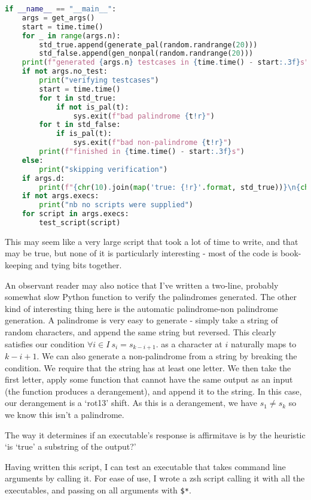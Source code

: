 \documentclass[fleqn,a4paper,11pt]{article}
\begin{document}
\begin{lstlisting}[language=Python, caption=Testing script]
if __name__ == "__main__":
    args = get_args()
    start = time.time()
    for _ in range(args.n):
        std_true.append(generate_pal(random.randrange(20)))
        std_false.append(gen_nonpal(random.randrange(20)))
    print(f"generated {args.n} testcases in {time.time() - start:.3f}s")
    if not args.no_test:
        print("verifying testcases")
        start = time.time()
        for t in std_true:
            if not is_pal(t):
                sys.exit(f"bad palindrome {t!r}")
        for t in std_false:
            if is_pal(t):
                sys.exit(f"bad non-palindrome {t!r}")
        print(f"finished in {time.time() - start:.3f}s")
    else:
        print("skipping verification")
    if args.d:
        print(f"{chr(10).join(map('true: {!r}'.format, std_true))}\n{chr(10).join(map('false: {!r}'.format, std_false))}")
    if not args.execs:
        print("nb no scripts were supplied")
    for script in args.execs:
        test_script(script)
\end{lstlisting}

    This may seem like a very large script that took a lot of time to write, and
    that may be true, but none of it is particularly interesting - most of the
    code is book-keeping and tying bits together.

    An observant reader may also notice that I've written a two-line, probably
    somewhat slow Python function to verify the palindromes generated. The other
    kind of interesting thing here is the automatic palindrome-non palindrome
    generation. A palindrome is very easy to generate - simply take a string of
    random characters, and append the same string but reversed. This clearly
    satisfies our condition
    \( \forall i \in I\ s_i = s_{k - i + 1} \).
    as a character at \(i\) naturally maps to \(k - i + 1\). We can also
    generate a non-palindrome from a string by breaking the condition. We
    require that the string has at least one letter. We then take the first
    letter, apply some function that cannot have the same output as an input
    (the function produces a derangement), and append it to the string. In this
    case, our derangement is a `rot13' shift. As this is a derangement, we have
    \( s_1 \neq s_k \) so we know this isn't a palindrome.

    The way it determines if an executable's response is affirmitave is by the
    heuristic `is `true' a substring of the output?'

    Having written this script, I can test an executable that takes command
    line arguments by calling it. For ease of use, I wrote a zsh script calling
    it with all the executables, and passing on all arguments with \texttt{\$*}.
\end{document}
